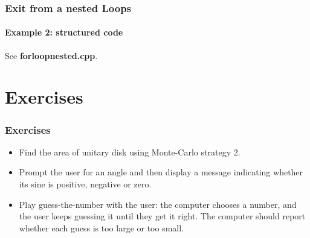 \documentclass[12pt]{beamer}
\begin{document}
\begin{frame}
	\frametitle{Exit from a nested Loops}
    \framesubtitle{Example 2: structured code}
\LstNestedStructured
    See \textbf{forloopnested.cpp}.
\end{frame}

\section{Exercises}

\begin{frame}
	\frametitle{Exercises}

	\begin{itemize}
        \item Find the area of unitary disk using Monte-Carlo strategy 2. 
		\item Prompt the user for an angle and then display a message
			indicating whether its sine is positive, negative or
			zero.
		\item Play guess-the-number with the user: the computer chooses
			a number, and the user keeps guessing it until they get it right.
			The computer should report whether each guess is too
			large or too small.
	\end{itemize}
\end{frame}
\end{document}
